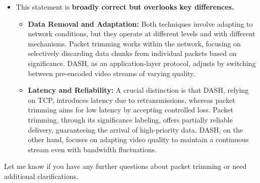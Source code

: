 \documentclass[
]{article}
\begin{document}
\begin{itemize}
  \begin{itemize}
  
  \item
    This statement is \textbf{broadly correct but overlooks key
    differences.}

    \begin{itemize}
    
    \item
      \textbf{Data Removal and Adaptation:} Both techniques involve
      adapting to network conditions, but they operate at different
      levels and with different mechanisms. Packet trimming works within
      the network, focusing on selectively discarding data chunks from
      individual packets based on significance. DASH, as an
      application-layer protocol, adjusts by switching between
      pre-encoded video streams of varying quality.
    \item
      \textbf{Latency and Reliability:} A crucial distinction is that
      DASH, relying on TCP, introduces latency due to retransmissions,
      whereas packet trimming aims for low latency by accepting
      controlled loss. Packet trimming, through its significance
      labeling, offers partially reliable delivery, guaranteeing the
      arrival of high-priority data. DASH, on the other hand, focuses on
      adapting video quality to maintain a continuous stream even with
      bandwidth fluctuations.
    \end{itemize}
  \end{itemize}
\end{itemize}

Let me know if you have any further questions about packet trimming or
need additional clarifications.
\end{document}
